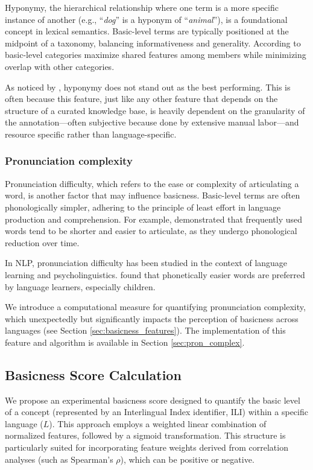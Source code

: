 \documentclass[preprint,12pt,authoryear]{elsarticle}
\begin{document}
Hyponymy, the hierarchical relationship where one term is a more specific instance of another (e.g., ``\textit{dog}'' is a hyponym of ``\textit{animal}''), is a foundational concept in lexical semantics. Basic-level terms are typically positioned at the midpoint of a taxonomy, balancing informativeness and generality. According to \citet{rosch_basic_1976} basic-level categories maximize shared features among members while minimizing overlap with other categories.

As noticed by  \citet{hollink_predicting_2020}, hyponymy does not stand out as the best performing. This is often because this feature, just like any other feature that depends on the structure of a curated knowledge base, is heavily dependent on the granularity of the annotation---often subjective because done by extensive manual labor---and resource specific rather than language-specific.

\subsubsection{Pronunciation complexity}

Pronunciation difficulty, which refers to the ease or complexity of articulating a word, is another factor that may influence basicness. Basic-level terms are often phonologically simpler, adhering to the principle of least effort in language production and comprehension. For example, \citet{bybee_language_2010} demonstrated that frequently used words tend to be shorter and easier to articulate, as they undergo phonological reduction over time.

In NLP, pronunciation difficulty has been studied in the context of language learning and psycholinguistics. \cite{gierut_phonological_2007} found that phonetically easier words are preferred by language learners, especially children.

We introduce a computational measure for quantifying pronunciation complexity, which unexpectedly but significantly impacts the perception of basicness across languages (see Section \ref{sec:basicness_features}). The implementation of this feature and algorithm is available in Section \ref{sec:pron_complex}.

\subsection{Basicness Score Calculation}
\label{sec:basicness_score_calc}

We propose an experimental basicness score designed to quantify the basic level of a concept (represented by an Interlingual Index identifier, ILI) within a specific language ($L$). This approach employs a weighted linear combination of normalized features, followed by a sigmoid transformation. This structure is particularly suited for incorporating feature weights derived from correlation analyses (such as Spearman's $\rho$), which can be positive or negative.
\end{document}
